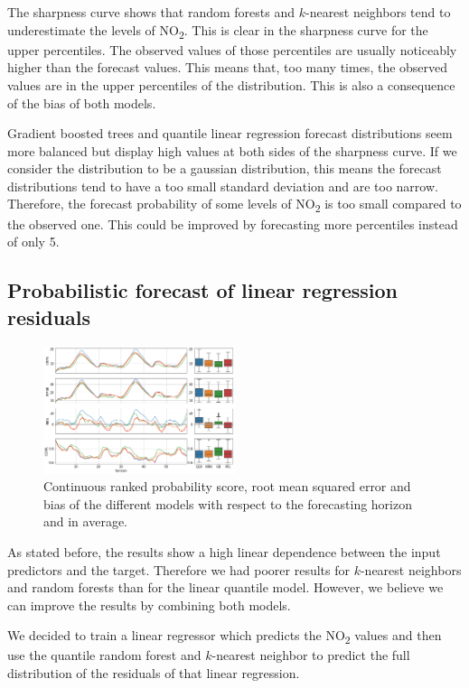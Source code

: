 \documentclass[a4paper,twocolumn,5p]{elsarticle}
\begin{document}
The sharpness curve shows that random forests and $k$-nearest
neighbors tend to underestimate the levels of
NO\textsubscript{2}. This is clear in the sharpness curve for the
upper percentiles. The observed values of those percentiles are
usually noticeably higher than the forecast values. This means that,
too many times, the observed values are in the upper percentiles of
the distribution. This is also a consequence of the bias of both
models.

Gradient boosted trees and quantile linear regression forecast
distributions seem more balanced but display high values at both sides
of the sharpness curve.  If we consider the distribution to be a
gaussian distribution, this means the forecast distributions tend to
have a too small standard deviation and are too narrow. Therefore, the
forecast probability of some levels of NO\textsubscript{2} is too
small compared to the observed one.  This could be improved by
forecasting more percentiles instead of only 5.

\subsection{Probabilistic forecast of linear regression residuals}

\begin{figure}[tbp]
  \centering
  \includegraphics[width=0.5\textwidth]{results/errorGraph_rfl_knnl}
  \caption{Continuous ranked probability score, root mean squared
    error and bias of the different models with respect to the
    forecasting horizon and in average.}
  \label{figure:errorGraph_rfl}
\end{figure}

As stated before, the results show a high linear dependence between
the input predictors and the target. Therefore we had poorer results
for $k$-nearest neighbors and random forests than for the linear
quantile model. However, we believe we can improve the results by
combining both models.

We decided to train a linear regressor which predicts the
NO\textsubscript{2} values and then use the quantile random forest and
$k$-nearest neighbor to predict the full distribution of the residuals
of that linear regression.
\end{document}
